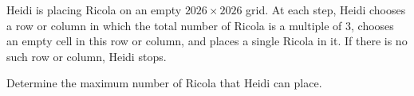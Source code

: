 Heidi is placing Ricola on an empty $2026 \times 2026$ grid.
At each step, Heidi chooses a row or column in which the total number of Ricola is a
multiple of $3$, chooses an empty cell in this row or column, and places a single Ricola in it.
If there is no such row or column, Heidi stops.

Determine the maximum number of Ricola that Heidi can place.
